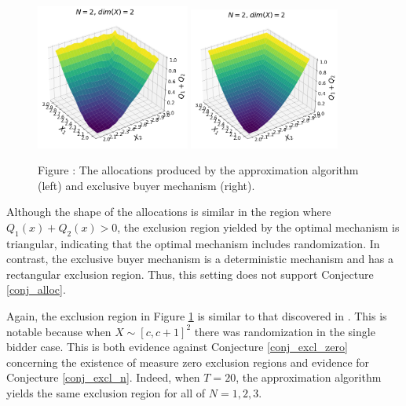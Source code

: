 \documentclass{article}
\newcounter{fig}
\begin{document}
\begin{figure}[H]
    \begin{center}
    \includegraphics[width=0.45\textwidth]{images/symmetric_independent_unif_23.png}
    \includegraphics[width=0.44\textwidth]{images/symmetric_independent_unif_23_ebm.png}
    \end{center}
    
    \vspace{1mm}
    \raggedright{\small {\sc Figure \thefig\label{fig:pavlov_n2_23_alloc}:} The allocations produced by the approximation algorithm (left) and exclusive buyer mechanism (right).} 
\end{figure}

\noindent Although the shape of the allocations is similar in the region where $Q_1(x) + Q_2(x) > 0$, the exclusion region yielded by the optimal mechanism is triangular, indicating that the optimal mechanism includes randomization. In contrast, the exclusive buyer mechanism is a deterministic mechanism and has a rectangular exclusion region. Thus, this setting does not support Conjecture \ref{conj_alloc}.

Again, the exclusion region in Figure \ref{fig:pavlov_n2_23_alloc} is similar to that discovered in \autocite{pavlov2011optimal}. This is notable because when $X \sim [c,c+1]^2$ there was randomization in the single bidder case. This is both evidence against Conjecture \ref{conj_excl_zero} concerning the existence of measure zero exclusion regions and evidence for Conjecture \ref{conj_excl_n}. Indeed, when $T=20$, the approximation algorithm yields the same exclusion region for all of $N=1,2,3$.
\end{document}
